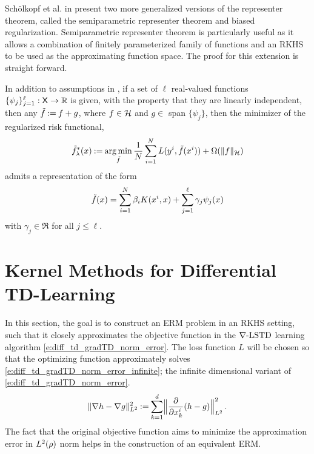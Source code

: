 Sch\"{o}lkopf et al. in \cite{schhersmo01} present two more generalized versions of the representer theorem, called the semiparametric representer theorem and biased regularization. Semiparametric representer theorem is particularly useful as it allows a combination of finitely parameterized family of functions and an RKHS to be used as the approximating function space. The proof for this extension is straight forward.  

\begin{theorem}
In addition to assumptions in , if a set of $\ell$ real-valued functions $\{\psi_j\}_{j=1}^\ell : {\sf X} \to \mathbb{R}$ is given, with the property that they are linearly independent, then any $\tilde f \mathbin{:=} f + g$, where $f \in {\cal H}$ and $g \in$ span $\{\psi_j\}$, then the minimizer of the regularized risk functional,
\begin{equation*}
\tilde f^*_\lambda(x) \mathbin{:=} \mathop{\rm arg{\,}min}_{\tilde f} \frac{1}{N} \sum_{i=1}^N L(y^i,\tilde f(x^i)) + \Omega(\|f\|_{\cal H})
\end{equation*}
admits a representation of the form
\begin{equation*}
\tilde f(x) = \sum_{i=1}^N \beta_i K(x^i, x) + \sum_{j=1}^\ell \gamma_j \psi_j(x)
\end{equation*}
with $\gamma_j \in \Re$ for all $j \leq \ell$. 
\end{theorem}
\section{Kernel Methods for Differential TD-Learning}
\label{s:kernel_choices}

In this section, the goal is to construct an ERM problem in an RKHS setting, such that it closely approximates the objective function in the $\nabla\text{-LSTD}$ learning algorithm \eqref{e:diff_td_gradTD_norm_error}. The loss function $L$ will be chosen so that the optimizing function approximately solves \eqref{e:diff_td_gradTD_norm_error_infinite}; the infinite dimensional variant of \eqref{e:diff_td_gradTD_norm_error}. 
\begin{equation}
\| \nabla h -  \nabla g \|^2_{L^2}   \eqdef \sum_{k=1}^d    \Bigl\|  \frac{\partial}{\partial x^i_k} (h-g)  \Bigr\|^2_{L^2}
\, .
\label{e:diff_td_gradTD_norm_error_infinite}
\end{equation}
The fact that the original objective function aims to minimize the approximation error in $L^2(\rho)$ norm helps in the construction of an equivalent ERM.

